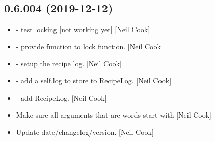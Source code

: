 \documentclass[a4paper,10pt,english]{report}
\begin{document}
\subsection{0.6.004 (2019-12-12)}
\label{\detokenize{misc/changelog:id15}}\begin{itemize}
\item {} 
 - test locking {[}not working yet{]} {[}Neil Cook{]}

\item {} 
 - provide function to lock function. {[}Neil Cook{]}

\item {} 
 - setup the recipe log. {[}Neil Cook{]}

\item {} 
 - add a self.log to store to RecipeLog. {[}Neil
Cook{]}

\item {} 
 - add RecipeLog. {[}Neil Cook{]}

\item {} 
Make sure all arguments that are words start with \textendash{} {[}Neil Cook{]}

\item {} 
Update date/changelog/version. {[}Neil Cook{]}

\end{itemize}
\end{document}

